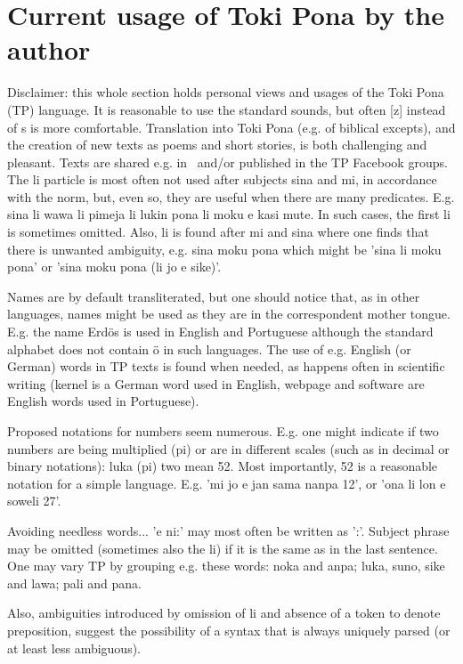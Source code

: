 \section{Current usage of Toki Pona by the author}\label{mytoki}
Disclaimer: this whole section holds personal views and usages of
the Toki Pona (TP) language.
It is reasonable to use the standard sounds, but often [z] instead of s
is more comfortable.
Translation into Toki Pona (e.g. of biblical excepts),
and the creation of new texts as poems and short stories,
is both challenging and pleasant.
Texts are shared e.g. in~\cite{tokisona}
and/or published in the TP Facebook groups.
The li particle is most often not used after subjects sina and mi,
in accordance with the norm,
but, even so, they are useful when there are many predicates.
E.g. sina li wawa li pimeja li lukin pona li moku e kasi mute.
In such cases, the first li is sometimes omitted.
Also, li is found after mi and sina where one finds
that there is unwanted ambiguity, e.g.
sina moku pona 
which 
might be 'sina li moku pona' or 'sina moku pona (li jo e sike)'.

Names are by default transliterated,
but one should notice that, as in other languages,
names might be used as they are in the
correspondent mother tongue.
E.g. the name Erdös is used in
English and Portuguese although the standard
alphabet does not contain ö in such languages.
The use of e.g. English (or German) words
in TP texts is found when needed,
as happens often in scientific writing
(kernel is a German word used in English,
webpage and software are English words used in Portuguese).

Proposed notations for numbers seem numerous.
E.g. one might indicate if two numbers
are being multiplied (pi) or are in different scales
(such as in decimal or binary notations):
luka (pi) two mean 52.
Most importantly,
52 is a reasonable notation for a simple language.
E.g.
'mi jo e jan sama nanpa 12',
or
'ona li lon e soweli 27'.

Avoiding needless words...
'e ni:' may most often be written as ':'.
Subject phrase may be omitted (sometimes also the li)
if it is the
same as in the last sentence.
One may vary TP by grouping e.g. these words:
noka and anpa; luka, suno, sike and lawa; pali and pana.

Also, ambiguities introduced by omission of li
and absence of a token to denote preposition,
suggest the possibility of a syntax that is always uniquely
parsed (or at least less ambiguous).

